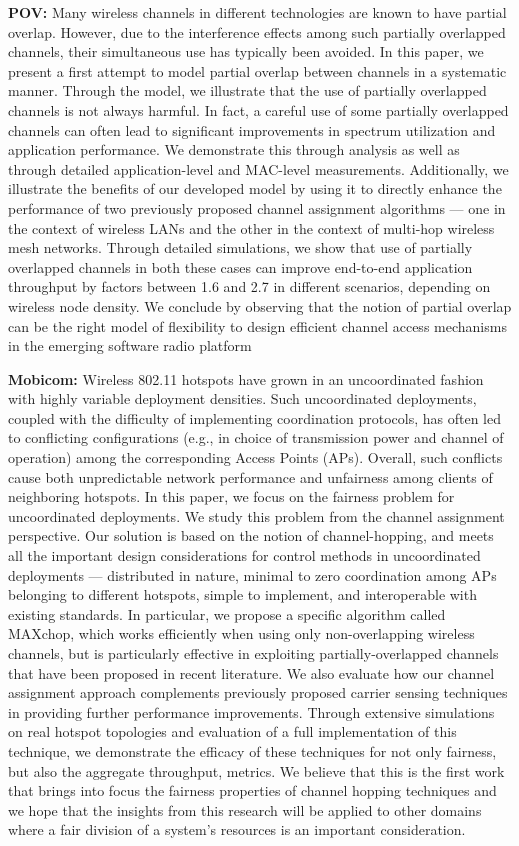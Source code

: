 \documentclass[10pt,letterpaper]{article}
\begin{document}
{\bf POV:}
Many wireless channels in different technologies are known to have
partial overlap. However, due to the interference effects among
such partially overlapped channels, their simultaneous use has typically
been avoided. In this paper, we present a first attempt to model
partial overlap between channels in a systematic manner. Through
the model, we illustrate that the use of partially overlapped channels
is not always harmful. In fact, a careful use of some partially
overlapped channels can often lead to significant improvements in
spectrum utilization and application performance. We demonstrate
this through analysis as well as through detailed application-level
and MAC-level measurements. Additionally, we illustrate the benefits
of our developed model by using it to directly enhance the
performance of two previously proposed channel assignment algorithms
— one in the context of wireless LANs and the other in the
context of multi-hop wireless mesh networks. Through detailed
simulations, we show that use of partially overlapped channels in
both these cases can improve end-to-end application throughput by
factors between 1.6 and 2.7 in different scenarios, depending on
wireless node density. We conclude by observing that the notion
of partial overlap can be the right model of flexibility to design efficient
channel access mechanisms in the emerging software radio
platform


{\bf Mobicom:}
Wireless 802.11 hotspots have grown in an uncoordinated fashion
with highly variable deployment densities. Such uncoordinated
deployments, coupled with the difficulty of implementing
coordination protocols, has often led to conflicting configurations
(e.g., in choice of transmission power and channel of operation)
among the corresponding Access Points (APs). Overall, such conflicts
cause both unpredictable network performance and unfairness
among clients of neighboring hotspots. In this paper, we focus on
the fairness problem for uncoordinated deployments. We study
this problem from the channel assignment perspective. Our solution
is based on the notion of channel-hopping, and meets all
the important design considerations for control methods in uncoordinated
deployments — distributed in nature, minimal to zero
coordination among APs belonging to different hotspots, simple
to implement, and interoperable with existing standards. In particular,
we propose a specific algorithm called MAXchop, which
works efficiently when using only non-overlapping wireless channels,
but is particularly effective in exploiting partially-overlapped
channels that have been proposed in recent literature. We also
evaluate how our channel assignment approach complements previously
proposed carrier sensing techniques in providing further
performance improvements. Through extensive simulations on real
hotspot topologies and evaluation of a full implementation of this
technique, we demonstrate the efficacy of these techniques for not
only fairness, but also the aggregate throughput, metrics.
We believe that this is the first work that brings into focus the
fairness properties of channel hopping techniques and we hope that
the insights from this research will be applied to other domains
where a fair division of a system’s resources is an important consideration.
\end{document}
